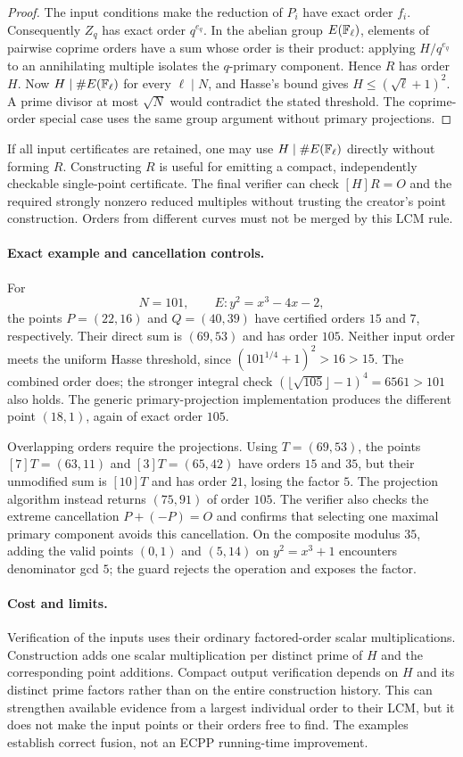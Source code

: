 \documentclass[11pt,a4paper]{article}
\theoremstyle{definition}\newtheorem{definition}[theorem]{Definition}
\theoremstyle{remark}\newtheorem{remark}[theorem]{Remark}
\begin{document}
\begin{proof}
The input conditions make the reduction of $P_i$ have exact order $f_i$.
Consequently $Z_q$ has exact order $q^{e_q}$.  In the abelian group
$E(\mathbb F_\ell)$, elements of pairwise coprime orders have a sum whose order
is their product: applying $H/q^{e_q}$ to an annihilating multiple isolates
the $q$-primary component.  Hence $R$ has order $H$.  Now
$H\mid\#E(\mathbb F_\ell)$ for every $\ell\mid N$, and Hasse's bound gives
$H\le(\sqrt\ell+1)^2$.  A prime divisor at most $\sqrt N$ would contradict
the stated threshold.  The coprime-order special case uses the same group
argument without primary projections.
\end{proof}

If all input certificates are retained, one may use
$H\mid\#E(\mathbb F_\ell)$ directly without forming $R$.  Constructing $R$ is
useful for emitting a compact, independently checkable single-point
certificate.  The final verifier can check $[H]R=O$ and the required
strongly nonzero reduced multiples without trusting the creator's point
construction.  Orders from different curves must not be merged by this
LCM rule.

\paragraph{Exact example and cancellation controls.}
For
\[
 N=101,\qquad E:y^2=x^3-4x-2,
\]
the points $P=(22,16)$ and $Q=(40,39)$ have certified orders $15$ and $7$,
respectively.  Their direct sum is $(69,53)$ and has order $105$.
Neither input order meets the uniform Hasse threshold, since
$(101^{1/4}+1)^2>16>15$.  The combined order does; the stronger integral
check $(\lfloor\sqrt{105}\rfloor-1)^4=6561>101$ also holds.
The generic primary-projection implementation produces the different
point $(18,1)$, again of exact order $105$.

Overlapping orders require the projections.  Using $T=(69,53)$, the points
$[7]T=(63,11)$ and $[3]T=(65,42)$ have orders $15$ and $35$, but their
unmodified sum is $[10]T$ and has order $21$, losing the factor $5$.
The projection algorithm instead returns $(75,91)$ of order $105$.
The verifier also checks the extreme cancellation $P+(-P)=O$ and confirms
that selecting one maximal primary component avoids this cancellation.
On the composite modulus $35$, adding the valid points $(0,1)$ and
$(5,14)$ on $y^2=x^3+1$ encounters denominator gcd $5$; the guard rejects
the operation and exposes the factor.

\paragraph{Cost and limits.}
Verification of the inputs uses their ordinary factored-order scalar
multiplications.  Construction adds one scalar multiplication per distinct
prime of $H$ and the corresponding point additions.  Compact output
verification depends on $H$ and its distinct prime factors rather than
on the entire construction history.  This can strengthen available
evidence from a largest individual order to their LCM, but it does not
make the input points or their orders free to find.  The examples establish
correct fusion, not an ECPP running-time improvement.
\end{document}

